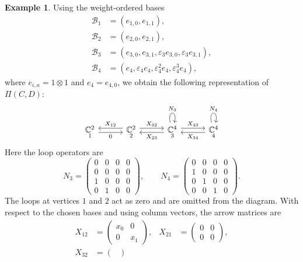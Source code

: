 \documentclass[12pt,reqno]{amsart}
\numberwithin{equation}{section}
\theoremstyle{definition}
\newtheorem{example}[theorem]{Example}
\theoremstyle{remark}
\theoremstyle{plain}
\theoremstyle{plain}
\begin{document}
\begin{example}
Using the weight-ordered bases
\[
\begin{aligned}
    \mathcal B_1&=(e_{1,0},e_{1,1}),\\
    \mathcal B_2&=(e_{2,0},e_{2,1}),\\
    \mathcal B_3&=(e_{3,0},e_{3,1},
        \varepsilon_3e_{3,0},\varepsilon_3e_{3,1}),\\
    \mathcal B_4&=(e_4,\varepsilon_4e_4,
        \varepsilon_4^2e_4,\varepsilon_4^3e_4),
\end{aligned}
\]
where $e_{i,a}=1\otimes1$ and $e_4=e_{4,0}$,
we obtain the following representation of $\Pi(C,D)$:
\[
\begin{tikzcd}[column sep=3em]
    \underset{1}{\mathbb C^2}
        \arrow[r,shift right=.6ex,"0"']
    & \underset{2}{\mathbb C^2}
        \arrow[l,shift right=.6ex,"X_{12}"']
        \arrow[r,shift left=.6ex,"X_{32}"]
    & \underset{3}{\mathbb C^4}
        \arrow[l,shift left=.6ex,"X_{23}"]
        \arrow[r,shift left=.6ex,"X_{43}"]
        \arrow[loop above,"N_3"]
    & \underset{4}{\mathbb C^4}
        \arrow[l,shift left=.6ex,"X_{34}"]
        \arrow[loop above,"N_4"]
\end{tikzcd}
\]
Here the loop operators are
\[
    N_3=
    \begin{pmatrix}
        0&0&0&0\\
        0&0&0&0\\
        1&0&0&0\\
        0&1&0&0
    \end{pmatrix},
    \qquad
    N_4=
    \begin{pmatrix}
        0&0&0&0\\
        1&0&0&0\\
        0&1&0&0\\
        0&0&1&0
    \end{pmatrix}.
\]
The loops at vertices $1$ and $2$ act as zero and are omitted from the diagram. With respect to the chosen bases and using column vectors, the arrow matrices are
\[
\begin{aligned}
    X_{12}
    &=
    \begin{pmatrix}
        x_0&0\\
        0&x_1
    \end{pmatrix},
    &
    X_{21}
    &=
    \begin{pmatrix}
        0&0\\
        0&0
    \end{pmatrix},
    \\[3mm]
    X_{32}
    &=
    \begin{pmatrix}

\end{pmatrix}
\end{aligned}\]
\end{example}
\end{document}
